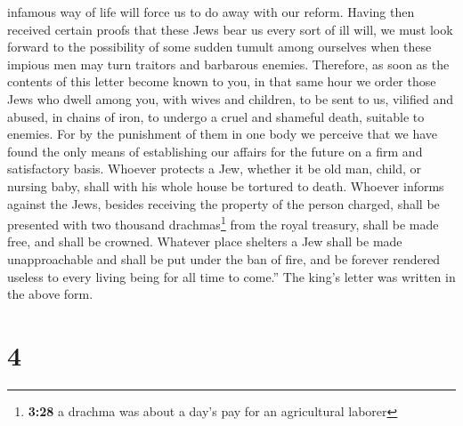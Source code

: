 infamous way of life will force us to do away with our reform.
 Having then received certain proofs that these Jews bear
us every sort of ill will, we must look forward to the possibility of
some sudden tumult among ourselves when these impious men may turn
traitors and barbarous enemies.  Therefore, as soon as
the contents of this letter become known to you, in that same hour we
order those Jews who dwell among you, with wives and children, to be
sent to us, vilified and abused, in chains of iron, to undergo a cruel
and shameful death, suitable to enemies.  For by the
punishment of them in one body we perceive that we have found the only
means of establishing our affairs for the future on a firm and
satisfactory basis.  Whoever protects a Jew, whether it
be old man, child, or nursing baby, shall with his whole house be
tortured to death.  Whoever informs against the Jews,
besides receiving the property of the person charged, shall be presented
with two thousand drachmas\footnote{\textbf{3:28} a drachma was about a
  day's pay for an agricultural laborer} from the royal treasury, shall
be made free, and shall be crowned.  Whatever place
shelters a Jew shall be made unapproachable and shall be put under the
ban of fire, and be forever rendered useless to every living being for
all time to come.''  The king's letter was written in the
above form.

\hypertarget{section-3}{%
\section{4}\label{section-3}}

